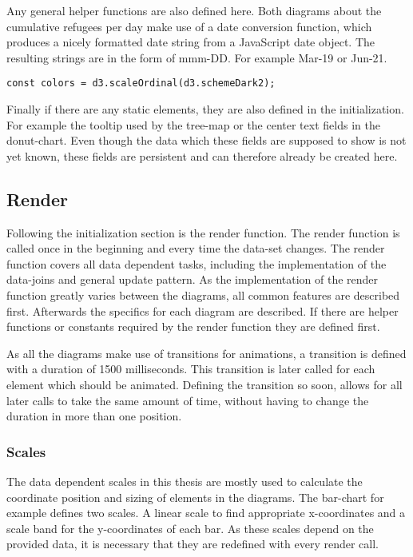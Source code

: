 Any general helper functions are also defined here. Both diagrams about the cumulative refugees per day make use of a date conversion function, which produces a nicely formatted date string from a JavaScript date object. The resulting strings are in the form of mmm-DD. For example Mar-19 or Jun-21.

\begin{minipage}{0.9\linewidth}
    \begin{lstlisting}[style=htmlcssjs, captionpos=b, caption={Definition of the data independent color scale. \texttt{d3.schemeDarkv2} is a predefined list of color values which is to be used by the scale.}, label={color_scale}]
const colors = d3.scaleOrdinal(d3.schemeDark2);
    \end{lstlisting}
\end{minipage}

Finally if there are any static elements, they are also defined in the initialization. For example the tooltip used by the tree-map or the center text fields in the donut-chart. Even though the data which these fields are supposed to show is not yet known, these fields are persistent and can therefore already be created here.

\subsection{Render}
Following the initialization section is the render function. The render function is called once in the beginning and every time the data-set changes. The render function covers all data dependent tasks, including the implementation of the data-joins and general update pattern. As the implementation of the render function greatly varies between the diagrams, all common features are described first. Afterwards the specifics for each diagram are described. If there are helper functions or constants required by the render function they are defined first. 

As all the diagrams make use of transitions for animations, a transition is defined with a duration of 1500 milliseconds. This transition is later called for each element which should be animated. Defining the transition so soon, allows for all later calls to take the same amount of time, without having to change the duration in more than one position.

\subsubsection{Scales}
The data dependent scales in this thesis are mostly used to calculate the coordinate position and sizing of elements in the diagrams.  The bar-chart for example defines two scales. A linear scale to find appropriate x-coordinates and a scale band for the y-coordinates of each bar. As these scales depend on the provided data, it is necessary that they are redefined with every render call.


